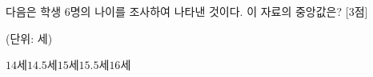 다음은 학생 $6$명의 나이를 조사하여 나타낸 것이다. 이 자료의 중앙값은? \mbox{[3점]}\par\noindent\hfill{\footnotesize (단위: 세)}
\begin{choices32}{$14$세}{$14.5$세}{$15$세}{$15.5$세}{$16$세}\end{choices32}
